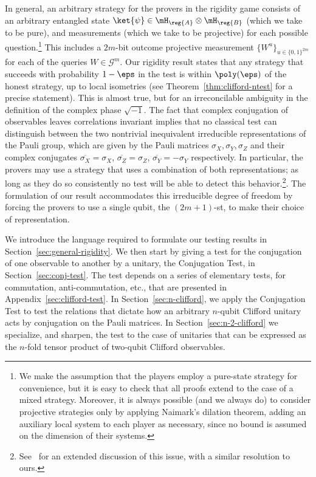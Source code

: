 In general, an arbitrary strategy for the provers in the rigidity game consists of an arbitrary entangled state $\ket{\psi} \in \mH_\reg{A} \otimes \mH_\reg{B}$ (which we take to be pure), and measurements (which we take to be projective) for each possible question.\footnote{We make the assumption that the players employ a pure-state strategy for convenience, but it is easy to check that all proofs extend to the case of a mixed strategy. Moreover, it is always possible (and we always do) to consider projective strategies only by applying Naimark's dilation theorem, adding an auxiliary local system to each player as necessary, since no bound is assumed on the dimension of their systems.} This includes a $2m$-bit outcome projective measurement $\{W^u\}_{u\in\{0,1\}^{2m}}$ for each of the queries $W\in\mathcal{G}^m$. Our rigidity result states that any strategy that succeeds with probability $1-\eps$ in the test is within $\poly(\eps)$ of the honest strategy, up to local isometries (see Theorem~\ref{thm:clifford-ntest} for a precise statement). This is almost true, but for an irreconcilable ambiguity in the definition of the complex phase $\sqrt{-1}$. The fact that complex conjugation of observables 
leaves correlations invariant implies that no classical test can distinguish between the two nontrivial inequivalent irreducible representations of the Pauli group, which are given by the Pauli matrices $\sigma_X,\sigma_Y,\sigma_Z$ and their complex conjugates $\overline{\sigma_X}=\sigma_X$, $\overline{\sigma_Z}=\sigma_Z$, $\overline{\sigma_Y}=-\sigma_Y$ respectively. In particular, the provers may use a strategy that uses a combination of both representations; as long as they do so consistently no test will be able to detect this behavior.\footnote{See~\cite[Appendix A]{reichardt2012classicalarxiv} for an extended discussion of this issue, with a similar resolution to ours.}.  The formulation of our result accommodates this irreducible degree of freedom by forcing the provers to use a single qubit, the $(2m+1)$-st, to make their choice of representation. 


We introduce the language required to formulate our testing results in Section~\ref{sec:general-rigidity}. We then start by giving a test for the conjugation of one observable to another by a unitary, the Conjugation Test, in Section~\ref{sec:conj-test}. The test depends on a series of elementary tests, for commutation, anti-commutation, etc., that are presented in Appendix~\ref{sec:clifford-test}.  
In Section~\ref{sec:n-clifford}, we apply the Conjugation Test  to test the relations that dictate how an arbitrary $n$-qubit Clifford unitary acts by conjugation on the Pauli matrices. In Section~\ref{sec:n-2-clifford} we specialize, and sharpen, the test to the case of unitaries that can be expressed as the $n$-fold tensor product of two-qubit Clifford observables.  

